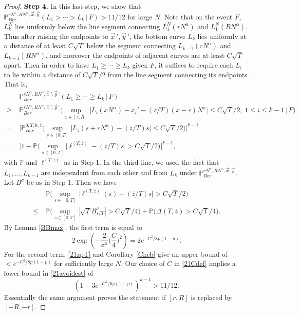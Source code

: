 \begin{proof}
		\noindent\textbf{Step 4.} In this last step, we show that $\mathbb{P}^{rN^\alpha, RN^\alpha,\vec{x},\vec{y}}_{Ber} (L_1 > \cdots > L_k\,|\,F) > 11/12$ for large $N$. Note that on the event $F$, $L_k^N$ lies uniformly below the line segment connecting $L_1^N(rN^\alpha)$ and $L_1^N(RN^\alpha)$. Thus after raising the endpoints to $\vec{x}\,',\vec{y}\,'$, the bottom curve $L_k$ lies uniformly at a distance of at least $C\sqrt{T}$ below the segment connecting $L_{k-1}(rN^\alpha)$ and $L_{k-1}(RN^\alpha)$, and moreover the endpoints of adjacent curves are at least $C\sqrt{T}$ apart. Then in order to have $L_1 \geq \cdots \geq L_k$ given $F$, it suffices to require each $L_i$ to lie within a distance of $C\sqrt{T}/2$ from the line segment connecting its endpoints. That is,
		\begin{align}
		&\mathbb{P}^{rN^\alpha, RN^\alpha,\vec{x}\,',\vec{y}\,'}_{Ber} (L_1 \geq \cdots \geq L_k\,|\,F) \nonumber\\
		\geq \; & \mathbb{P}^{rN^\alpha, RN^\alpha,\vec{x}\,',\vec{y}\,'}_{Ber} \Big(\sup_{x\in[r,R]} \big|L_i(xN^\alpha) - x_i' - (\overline{z}/T)(x-r)N^\alpha\big| \leq C\sqrt{T}/2, \;1\leq i\leq k-1\,\Big|\,F\Big) \nonumber\\
		= \; & \Big[ \mathbb{P}^{0,T,0,\overline{z}}_{Ber} \Big(\sup_{s\in[0,T]} \big|L_1(s+rN^\alpha) - (\overline{z}/T)s\big| \leq C\sqrt{T}/2\Big)\Big]^{k-1} \nonumber\\
		= \; & \Big[ 1 - \mathbb{P}\Big(\sup_{s\in[0,T]} \big|\ell^{(T,\overline{z})} - (\overline{z}/T)s\big| > C\sqrt{T}/2\Big)\Big]^{k-1}, \label{21avoidest}
		\end{align}
		with $\mathbb{P}$ and $\ell^{(T,\overline{z})}$ as in Step 1. In the third line, we used the fact that $L_1,\dots,L_{k-1}$ are independent from each other and from $L_k$ under $\mathbb{P}^{rN^\alpha, RN^\alpha,\vec{x},\vec{y}}_{Ber}$. Let $B^\sigma$ be as in Step 1. Then we have
		\begin{align*}
		&\mathbb{P} \Big(\sup_{s\in[0,T]} \big|\ell^{(T,\overline{z})}(s) - (\overline{z}/T)s\big| > C\sqrt{T}/2\Big)\\
		\leq \; & \mathbb{P}\Big(\sup_{s\in[0,T]} |\sqrt{T}B^{\sigma}_{s/T}| > C\sqrt{T}/4\Big) + \mathbb{P}\Big(\Delta(T,\overline{z}) > C\sqrt{T}/4\Big).
		\end{align*}
		By Lemma \ref{BBmax}, the first term is equal to
		\[
		2\exp\left(-\frac{2}{\sigma^2}\Big(\frac{C}{4}\Big)^2\right) = 2e^{-C^2/8p(1-p)}.
		\]
		For the second term, \eqref{21zpT} and Corollary \ref{Cheb} give an upper bound of $<e^{-C^2/8p(1-p)}$ for sufficiently large $N$. Our choice of $C$ in \eqref{21Cdef} implies a lower bound in \eqref{21avoidest} of
		\[
		(1-3e^{-C^2/8p(1-p)})^{k-1} > 11/12.
		\]
		\noindent Essentially the same argument proves the statement if $[r,R]$ is replaced by $[-R,-r]$.
		
	\end{proof}

